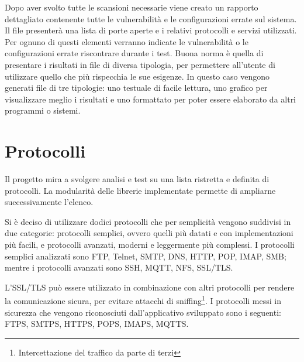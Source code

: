 \documentclass[12pt]{report}
\begin{document}
Dopo aver svolto tutte le scansioni necessarie viene creato un rapporto dettagliato contenente tutte le vulnerabilità e le configurazioni errate sul sistema. Il file presenterà una lista di porte aperte e i relativi protocolli e servizi utilizzati. Per ognuno di questi elementi verranno indicate le vulnerabilità o le configurazioni errate riscontrare durante i test. Buona norma è quella di presentare i risultati in file di diversa tipologia, per permettere all'utente di utilizzare quello che più rispecchia le sue esigenze. In questo caso vengono generati file di tre tipologie: uno testuale di facile lettura, uno grafico per visualizzare meglio i risultati e uno formattato per poter essere elaborato da altri programmi o sistemi.

\section{Protocolli}

Il progetto mira a svolgere analisi e test su una lista ristretta e definita di protocolli. La modularità delle librerie implementate permette di ampliarne successivamente l'elenco. 

Si è deciso di utilizzare dodici protocolli che per semplicità vengono suddivisi in due categorie: protocolli semplici, ovvero quelli più datati e con implementazioni più facili, e protocolli avanzati, moderni e leggermente più complessi. I protocolli semplici analizzati sono FTP, Telnet, SMTP, DNS, HTTP, POP, IMAP, SMB; mentre i protocolli avanzati sono SSH, MQTT, NFS, SSL/TLS.

L'SSL/TLS può essere utilizzato in combinazione con altri protocolli per rendere la comunicazione sicura, per evitare attacchi di sniffing\footnote{Intercettazione del traffico da parte di terzi}. I protocolli messi in sicurezza che vengono riconosciuti dall'applicativo sviluppato sono i seguenti: FTPS, SMTPS, HTTPS, POPS, IMAPS, MQTTS.\cite{rfcFTPSSL}\cite{rfcSMTPSSL}\cite{rfcHTTPSSL}\cite{rfcIMAPPOPSSL}
\end{document}
